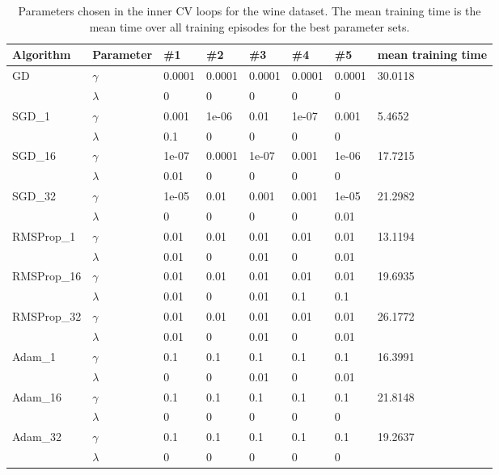 \documentclass[10pt,conference,compsocconf]{IEEEtran}
\begin{document}
\begin{table}[htbp]
	\centering
	\begin{tabular}[c]{llllllll}
		\hline
		Algorithm&Parameter&\#1&\#2&\#3&\#4&\#5&mean training time\\
		\hline
		
		\multirow{2}{*}{GD}&$\gamma$&0.0001&0.0001&0.0001&0.0001&0.0001&\multirow{2}{*}{30.0118}\\
							&$\lambda$&0&0&0&0&0&\\

		\multirow{2}{*}{SGD\_1}&$\gamma$&0.001&1e-06&0.01&1e-07&0.001&\multirow{2}{*}{5.4652}\\
								&$\lambda$&0.1&0&0&0&0&\\
		\multirow{2}{*}{SGD\_16}&$\gamma$&1e-07&0.0001&1e-07&0.001&1e-06&\multirow{2}{*}{17.7215}\\
								&$\lambda$&0.01&0&0&0&0&\\
		\multirow{2}{*}{SGD\_32}&$\gamma$&1e-05&0.01&0.001&0.001&1e-05&\multirow{2}{*}{21.2982}\\
								&$\lambda$&0&0&0&0&0.01&\\
			

		\multirow{2}{*}{RMSProp\_1}&$\gamma$&0.01&0.01&0.01&0.01&0.01&\multirow{2}{*}{13.1194}\\
									&$\lambda$&0.01&0&0.01&0&0.01&\\
		\multirow{2}{*}{RMSProp\_16}&$\gamma$&0.01&0.01&0.01&0.01&0.01&\multirow{2}{*}{19.6935}\\
									&$\lambda$&0.01&0&0.01&0.1&0.1&\\
		\multirow{2}{*}{RMSProp\_32}&$\gamma$&0.01&0.01&0.01&0.01&0.01&\multirow{2}{*}{26.1772}\\
									&$\lambda$&0.01&0&0.01&0&0.01&\\
		
		\multirow{2}{*}{Adam\_1}&$\gamma$&0.1&0.1&0.1&0.1&0.1&\multirow{2}{*}{16.3991}\\
								&$\lambda$&0&0&0.01&0&0.01&\\
		\multirow{2}{*}{Adam\_16}&$\gamma$&0.1&0.1&0.1&0.1&0.1&\multirow{2}{*}{21.8148}\\
								&$\lambda$&0&0&0&0&0&\\
		\multirow{2}{*}{Adam\_32}&$\gamma$&0.1&0.1&0.1&0.1&0.1&\multirow{2}{*}{19.2637}\\
								&$\lambda$&0&0&0&0&0&\\
		\hline
	\end{tabular}
	\caption{Parameters chosen in the inner CV loops for the wine dataset. The mean training time is the mean time over all training episodes for the best parameter sets.}
	\label{tab:parameter_wine}
\end{table}
\end{document}
